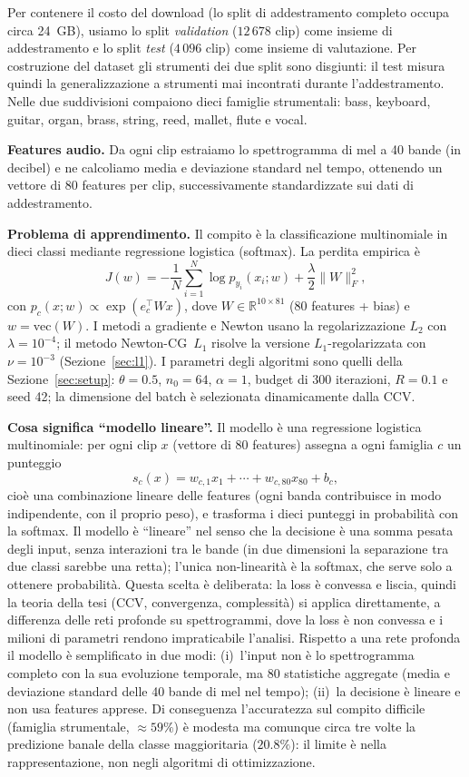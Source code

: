 \documentclass[italian, a4paper, twoside, binding=6mm]{sapthesis}
\begin{document}
Per contenere il costo del download (lo split di addestramento completo
occupa circa 24~GB), usiamo lo split \emph{validation} ($12\,678$ clip) come
insieme di addestramento e lo split \emph{test} ($4\,096$ clip) come insieme
di valutazione. Per costruzione del dataset gli strumenti dei due split sono
disgiunti: il test misura quindi la generalizzazione a strumenti mai
incontrati durante l'addestramento. Nelle due suddivisioni compaiono dieci
famiglie strumentali: bass, keyboard, guitar, organ, brass, string, reed,
mallet, flute e vocal.

\textbf{Features audio.} Da ogni clip estraiamo lo spettrogramma di mel a
40 bande (in decibel) e ne calcoliamo media e deviazione standard nel tempo,
ottenendo un vettore di 80 features per clip, successivamente standardizzate
sui dati di addestramento.

\textbf{Problema di apprendimento.} Il compito è la classificazione
multinomiale in dieci classi mediante regressione logistica (softmax). La
perdita empirica è
\[
  J(w) = -\frac{1}{N}\sum_{i=1}^{N}\log p_{y_i}(x_i; w)
         + \frac{\lambda}{2}\|W\|_F^2,
\]
con $p_c(x; w) \propto \exp(e_c^{\top} W x)$, dove $W \in \mathbb{R}^{10\times 81}$
(80 features + bias) e $w = \mathrm{vec}(W)$. I metodi a gradiente e Newton
usano la regolarizzazione $L_2$ con $\lambda = 10^{-4}$; il metodo
Newton-CG~$L_1$ risolve la versione $L_1$-regolarizzata con $\nu = 10^{-3}$
(Sezione~\ref{sec:l1}). I parametri degli algoritmi sono quelli della
Sezione~\ref{sec:setup}: $\theta = 0.5$, $n_0 = 64$, $\alpha = 1$, budget di
300 iterazioni, $R = 0.1$ e seed 42; la dimensione del batch è selezionata
dinamicamente dalla CCV.

\textbf{Cosa significa ``modello lineare''.} Il modello è una regressione
logistica multinomiale: per ogni clip $x$ (vettore di 80 features) assegna a
ogni famiglia $c$ un punteggio
\[
  s_c(x) = w_{c,1}x_1 + \cdots + w_{c,80}x_{80} + b_c,
\]
cioè una combinazione lineare delle features (ogni banda contribuisce in modo
indipendente, con il proprio peso), e trasforma i dieci punteggi in
probabilità con la softmax. Il modello è ``lineare'' nel senso che la
decisione è una somma pesata degli input, senza interazioni tra le bande (in
due dimensioni la separazione tra due classi sarebbe una retta); l'unica
non-linearità è la softmax, che serve solo a ottenere probabilità. Questa
scelta è deliberata: la loss è convessa e liscia, quindi la teoria della tesi
(CCV, convergenza, complessità) si applica direttamente, a differenza delle
reti profonde su spettrogrammi, dove la loss è non convessa e i milioni di
parametri rendono impraticabile l'analisi. Rispetto a una rete profonda il
modello è semplificato in due modi: (i)~l'input non è lo spettrogramma
completo con la sua evoluzione temporale, ma 80 statistiche aggregate (media
e deviazione standard delle 40 bande di mel nel tempo); (ii)~la decisione è
lineare e non usa features apprese. Di conseguenza l'accuratezza sul compito
difficile (famiglia strumentale, $\approx 59\%$) è modesta ma comunque circa
tre volte la predizione banale della classe maggioritaria ($20.8\%$): il
limite è nella rappresentazione, non negli algoritmi di ottimizzazione.
\end{document}
